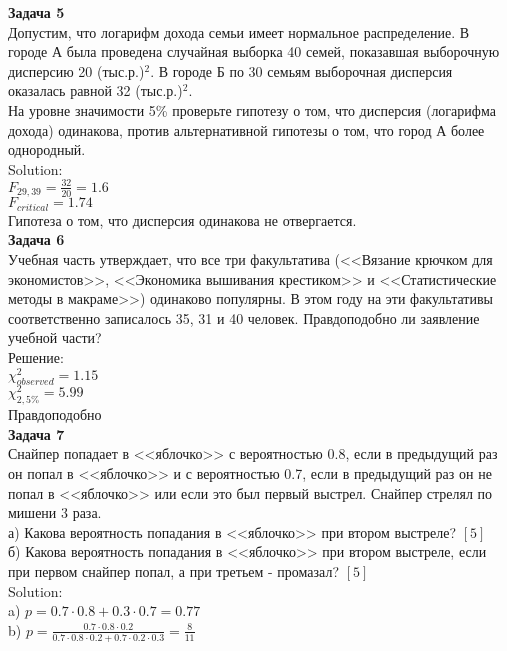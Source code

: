 \documentclass[pdftex,12pt,a4paper]{article}
\begin{document}
\textbf{Задача 5} \\ %
Допустим, что логарифм дохода семьи имеет нормальное распределение. В городе А была проведена случайная выборка 40 семей, показавшая выборочную дисперсию 20 (тыс.р.)$^{2}$. В городе Б по 30 семьям выборочная дисперсия оказалась равной 32 (тыс.р.)$^{2}$. \\
На уровне значимости 5\% проверьте гипотезу о том, что дисперсия (логарифма дохода) одинакова, против альтернативной гипотезы о том, что город А более однородный. \\
Solution: \\
$F_{29,39}=\frac{32}{20}=1.6$ \\
$F_{critical}=1.74$ \\
Гипотеза о том, что дисперсия одинакова не отвергается. \\

\textbf{Задача 6} \\ %
Учебная часть утверждает, что все три факультатива (<<Вязание крючком для экономистов>>, <<Экономика вышивания крестиком>> и <<Статистические методы в макраме>>) одинаково популярны. В этом году на эти факультативы соответственно записалось 35, 31 и 40 человек. Правдоподобно ли заявление учебной части? \\
Решение: \\
$\chi^{2}_{observed}=1.15$ \\
$\chi^{2}_{2,5\%}=5.99$ \\
Правдоподобно \\

\textbf{Задача 7} \\ %
Снайпер попадает в <<яблочко>> с вероятностью 0.8, если в предыдущий раз он попал в <<яблочко>> и с вероятностью 0.7, если в предыдущий раз он не попал в <<яблочко>> или если это был первый выстрел. Снайпер стрелял по мишени 3 раза. \\
а) Какова вероятность попадания в <<яблочко>> при втором выстреле? $[5]$ \\
б) Какова вероятность попадания в <<яблочко>> при втором выстреле, если при первом снайпер попал, а при третьем - промазал? $[5]$ \\ 
Solution: \\
a) $p=0.7\cdot 0.8+ 0.3\cdot 0.7=0.77$ \\
b) $p=\frac{0.7\cdot0.8\cdot0.2}{0.7\cdot 0.8\cdot 0.2 + 0.7\cdot 0.2 \cdot 0.3}=\frac{8}{11}$ \\
\end{document}
